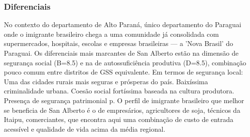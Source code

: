 \subsubsection*{Diferenciais}\label{dif-san-alberto-1018}
No contexto do departamento de Alto Paraná, único departamento do Paraguai onde o imigrante brasileiro chega a uma comunidade já consolidada com supermercados, hospitais, escolas e empresas brasileiras — a 'Nova Brasil' do Paraguai. Os diferenciais mais marcantes de San Alberto estão na dimensão de segurança social (B=8.5) e na de autossuficiência produtiva (D=8.5), combinação pouco comum entre distritos de GSS equivalente. Em termos de segurança local: Uma das cidades rurais mais seguras e prósperas do país. Baixíssima criminalidade urbana. Coesão social fortíssima baseada na cultura produtora. Presença de segurança patrimonial p. O perfil de imigrante brasileiro que melhor se beneficia de San Alberto é o de empresários, agricultores de soja, técnicos da Itaipu, comerciantes, que encontra aqui uma combinação de custo de entrada acessível e qualidade de vida acima da média regional.
